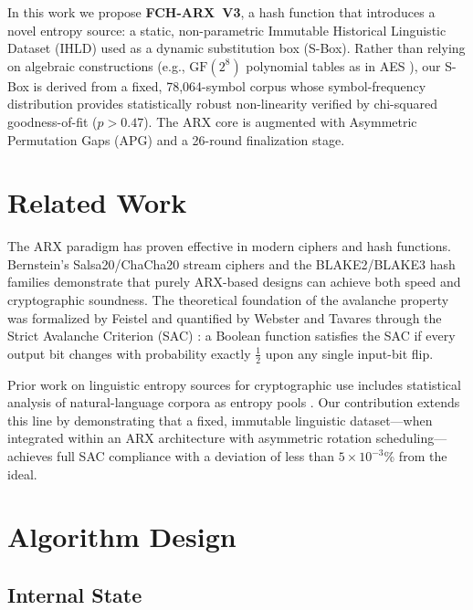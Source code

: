 \documentclass[12pt,journal]{IEEEtran}
\begin{document}
In this work we propose \textbf{FCH-ARX~V3}, a hash function that introduces a
novel entropy source: a static, non-parametric Immutable Historical Linguistic
Dataset (IHLD) used as a dynamic substitution box (S-Box). Rather than
relying on algebraic constructions (e.g., $\mathrm{GF}(2^8)$ polynomial tables
as in AES \cite{aes2001}), our S-Box is derived from a fixed, 78{,}064-symbol
corpus whose symbol-frequency distribution provides statistically robust
non-linearity verified by chi-squared goodness-of-fit ($p > 0.47$). The ARX
core is augmented with Asymmetric Permutation Gaps (APG) and a 26-round
finalization stage.

\section{Related Work}

The ARX paradigm has proven effective in modern ciphers and hash functions.
Bernstein's Salsa20/ChaCha20 stream ciphers \cite{chacha2008} and the
BLAKE2/BLAKE3 hash families \cite{blake2} demonstrate that purely ARX-based
designs can achieve both speed and cryptographic soundness. The theoretical
foundation of the avalanche property was formalized by Feistel \cite{feistel1973}
and quantified by Webster and Tavares through the Strict Avalanche Criterion
(SAC) \cite{sac1985}: a Boolean function satisfies the SAC if every output bit
changes with probability exactly $\frac{1}{2}$ upon any single input-bit flip.

Prior work on linguistic entropy sources for cryptographic use includes
statistical analysis of natural-language corpora as entropy pools
\cite{shannon1949}. Our contribution extends this line by demonstrating that a
fixed, immutable linguistic dataset---when integrated within an ARX
architecture with asymmetric rotation scheduling---achieves full SAC compliance
with a deviation of less than $5\times10^{-3}$\% from the ideal.

\section{Algorithm Design}

\subsection{Internal State}
\end{document}

